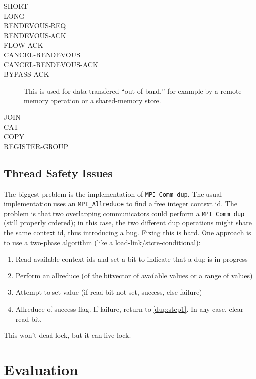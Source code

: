 \documentclass{article}
\begin{document}
\begin{description}
\item[SHORT]
\item[LONG]
\item[RENDEVOUS-REQ]
\item[RENDEVOUS-ACK]
\item[FLOW-ACK]
\item[CANCEL-RENDEVOUS]
\item[CANCEL-RENDEVOUS-ACK]
\item[BYPASS-ACK]This is used for data transfered ``out of band,'' for example
  by a remote memory operation or a shared-memory store.

\item[JOIN]
\item[CAT]
\item[COPY]
\item[REGISTER-GROUP]
\end{description}

\subsection{Thread Safety Issues}
The biggest problem is the implementation of \texttt{MPI\_Comm\_dup}.  The
usual implementation uses an \texttt{MPI\_Allreduce} to find a free integer
context id.  The problem is that two overlapping communicators could perform a
\texttt{MPI\_Comm\_dup} (still properly ordered); in this case, the two
different dup operations might share the same context id, thus introducing a
bug.  Fixing this is hard.  One approach is to use a two-phase algorithm (like
a load-link/store-conditional):
\begin{enumerate}
\item Read available context ids and set a bit to indicate that a dup is in
  progress\label{dup:step1}
\item Perform an allreduce (of the bitvector of available values or a range of
  values)
\item Attempt to set value (if read-bit not set, success, else failure)
\item Allreduce of success flag.  If failure, return to \ref{dup:step1}.
In any case, clear read-bit.
\end{enumerate}
This won't dead lock, but it can live-lock.  
\section{Evaluation}



\end{document}
